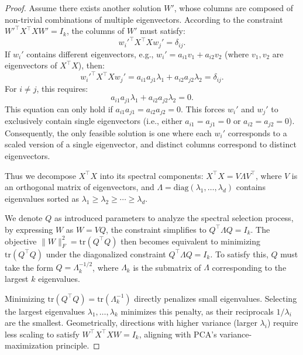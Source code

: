 \begin{proof}
Assume there exists another solution \( W' \), whose columns are composed of non-trivial combinations of multiple eigenvectors. According to the constraint \( W'^\top X^\top X W' = I_k \), the columns of \( W' \) must satisfy:  
\begin{equation}
w_i'^\top X^\top X w_j' = \delta_{ij}.
\end{equation}
If \( w_i' \) contains different eigenvectors, e.g., \( w_i' = a_{i1}v_1 + a_{i2}v_2 \) (where \( v_1, v_2 \) are eigenvectors of \( X^\top X \)), then:  
\begin{equation}
    w_i'^\top X^\top X w_j' = a_{i1}a_{j1}\lambda_1 + a_{i2}a_{j2}\lambda_2 = \delta_{ij}.
\end{equation}  
For \( i \neq j \), this requires:  
\begin{equation}
    a_{i1}a_{j1}\lambda_1 + a_{i2}a_{j2}\lambda_2 = 0.    
\end{equation}
This equation can only hold if \( a_{i1}a_{j1} = a_{i2}a_{j2} = 0 \). This forces \( w_i' \) and \( w_j' \) to exclusively contain single eigenvectors (i.e., either \( a_{i1} = a_{j1} = 0 \) or \( a_{i2} = a_{j2} = 0 \)). Consequently, the only feasible solution is one where each \( w_i' \) corresponds to a scaled version of a single eigenvector, and distinct columns correspond to distinct eigenvectors.  


Thus we decompose \( X^\top X \) into its spectral components: \( X^\top X = V \Lambda V^\top \), where \( V \) is an orthogonal matrix of eigenvectors, and \( \Lambda = \text{diag}(\lambda_1, \dots, \lambda_d) \) contains eigenvalues sorted as \( \lambda_1 \geq \lambda_2 \geq \cdots \geq \lambda_d \).  

We denote $Q$ as introduced parameters to analyze the spectral selection process, by expressing \( W \) as \( W = V Q \), the constraint simplifies to \( Q^\top \Lambda Q = I_k \). The objective \( \|W\|_F^2 = \text{tr}(Q^\top Q) \) then becomes equivalent to minimizing \( \text{tr}(Q^\top Q) \) under the diagonalized constraint \( Q^\top \Lambda Q = I_k \). To satisfy this, \( Q \) must take the form \( Q = \Lambda_k^{-1/2} \), where \( \Lambda_k \) is the submatrix of \( \Lambda \) corresponding to the largest \( k \) eigenvalues.  

Minimizing \( \text{tr}(Q^\top Q) = \text{tr}(\Lambda_k^{-1}) \) directly penalizes small eigenvalues. Selecting the largest eigenvalues \( \lambda_1, \dots, \lambda_k \) minimizes this penalty, as their reciprocals \( 1/\lambda_i \) are the smallest. Geometrically, directions with higher variance (larger \( \lambda_i \)) require less scaling to satisfy \( W^\top X^\top X W = I_k \), aligning with PCA’s variance-maximization principle.  


\end{proof}
